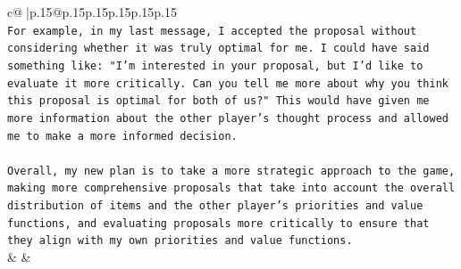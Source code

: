 \documentclass{article}
\begin{document}
{\begin{supertabular}{c@{$\;$}|p{.15\linewidth}@{}p{.15\linewidth}p{.15\linewidth}p{.15\linewidth}p{.15\linewidth}p{.15\linewidth}}
{{{\\ 
\texttt{For example, in my last message, I accepted the proposal without considering whether it was truly optimal for me. I could have said something like: "I'm interested in your proposal, but I'd like to evaluate it more critically. Can you tell me more about why you think this proposal is optimal for both of us?" This would have given me more information about the other player's thought process and allowed me to make a more informed decision.} \\
\\ 
\texttt{Overall, my new plan is to take a more strategic approach to the game, making more comprehensive proposals that take into account the overall distribution of items and the other player's priorities and value functions, and evaluating proposals more critically to ensure that they align with my own priorities and value functions.} \\
            }
        }
    }
    & & \\ \\


\end{supertabular}}
\end{document}
